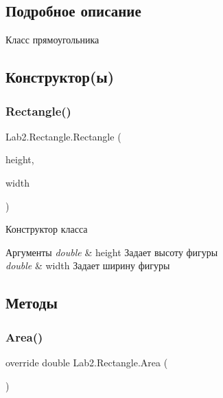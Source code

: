 \subsection{Подробное описание}
Класс прямоугольника 

\subsection{Конструктор(ы)}
\mbox{\label{class_lab2_1_1_rectangle_acdb99dd549f51743792cad788e500849}} 
\subsubsection{\texorpdfstring{Rectangle()}{Rectangle()}}
{\footnotesize\ttfamily Lab2.\+Rectangle.\+Rectangle (\begin{DoxyParamCaption}\item[{double}]{height,  }\item[{double}]{width }\end{DoxyParamCaption})}

Конструктор класса 
\begin{DoxyParams}{Аргументы}
{\em double} & height Задает высоту фигуры \\
\hline
{\em double} & width Задает ширину фигуры \\
\hline
\end{DoxyParams}


\subsection{Методы}
\mbox{\label{class_lab2_1_1_rectangle_a3a44a2229aaec3be07a35eb6a167b100}} 
\subsubsection{\texorpdfstring{Area()}{Area()}}
{\footnotesize\ttfamily override double Lab2.\+Rectangle.\+Area (\begin{DoxyParamCaption}{ }\end{DoxyParamCaption})\hspace{0.3cm}{\ttfamily [virtual]}}

